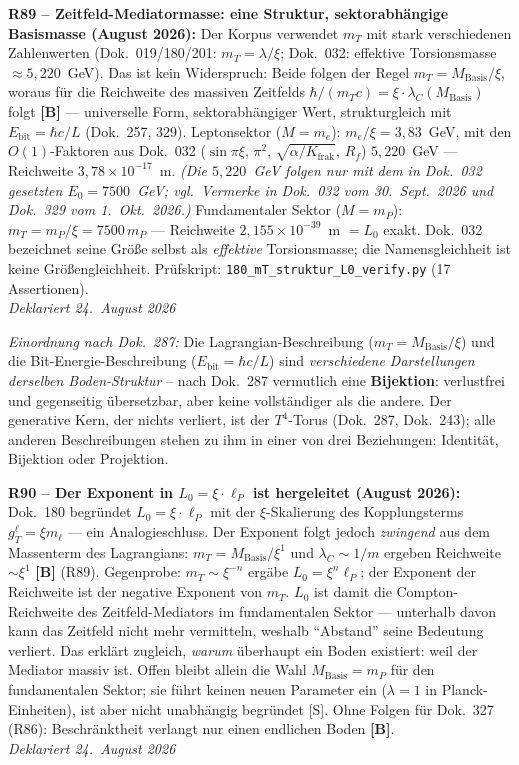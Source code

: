 \medskip

\textbf{R89 -- Zeitfeld-Mediatormasse: eine Struktur, sektorabh\"angige Basismasse (August 2026):}
Der Korpus verwendet $m_T$ mit stark verschiedenen Zahlenwerten (Dok.~019/180/201: $m_T = \lambda/\xi$; Dok.~032: effektive Torsionsmasse $\approx 5{,}220$~GeV). Das ist kein Widerspruch: Beide folgen der Regel $m_T = M_\mathrm{Basis}/\xi$, woraus f\"ur die Reichweite des massiven Zeitfelds $\hbar/(m_T c) = \xi\cdot\lambda_C(M_\mathrm{Basis})$ folgt \textbf{[B]} --- universelle Form, sektorabh\"angiger Wert, strukturgleich mit $E_\mathrm{bit} = \hbar c/L$ (Dok.~257, 329).
Leptonsektor ($M = m_e$): $m_e/\xi = 3{,}83$~GeV, mit den $O(1)$-Faktoren aus Dok.~032 ($\sin\pi\xi$, $\pi^2$, $\sqrt{\alpha/K_\mathrm{frak}}$, $R_f$) $5{,}220$~GeV --- Reichweite $3{,}78\times10^{-17}$~m. \emph{(Die $5{,}220$~GeV folgen nur mit dem in Dok.~032 gesetzten $E_0=7500$~GeV; vgl.\ Vermerke in Dok.~032 vom 30.~Sept.~2026 und Dok.~329 vom 1.~Okt.~2026.)}
Fundamentaler Sektor ($M = m_P$): $m_T = m_P/\xi = 7500\,m_P$ --- Reichweite $2{,}155\times10^{-39}$~m $= L_0$ exakt.
Dok.~032 bezeichnet seine Gr\"o\ss{}e selbst als \emph{effektive} Torsionsmasse; die Namensgleichheit ist keine Gr\"o\ss{}engleichheit.
Pr\"ufskript: \texttt{180\_mT\_struktur\_L0\_verify.py} (17 Assertionen).\\
\emph{Deklariert 24.~August 2026}

\medskip

\noindent\textit{Einordnung nach Dok.~287:} Die Lagrangian-Beschreibung
($m_T = M_\mathrm{Basis}/\xi$) und die Bit-Energie-Beschreibung
($E_\mathrm{bit} = \hbar c/L$) sind \emph{verschiedene Darstellungen derselben
Boden-Struktur} -- nach Dok.~287 vermutlich eine \textbf{Bijektion}: verlustfrei
und gegenseitig \"ubersetzbar, aber keine vollst\"andiger als die andere.
Der generative Kern, der nichts verliert, ist der $T^4$-Torus (Dok.~287, Dok.~243);
alle anderen Beschreibungen stehen zu ihm in einer von drei Beziehungen:
Identit\"at, Bijektion oder Projektion.

\medskip
\textbf{R90 -- Der Exponent in $L_0 = \xi\cdot\ell_P$ ist hergeleitet (August 2026):}
Dok.~180 begr\"undet $L_0 = \xi\cdot\ell_P$ mit der $\xi$-Skalierung des Kopplungsterms $g_T^\ell = \xi m_\ell$ --- ein Analogieschluss.
Der Exponent folgt jedoch \emph{zwingend} aus dem Massenterm des Lagrangians: $m_T = M_\mathrm{Basis}/\xi^1$ und $\lambda_C \sim 1/m$ ergeben Reichweite $\sim\xi^1$ \textbf{[B]} (R89).
Gegenprobe: $m_T \sim \xi^{-n}$ erg\"abe $L_0 = \xi^n\ell_P$; der Exponent der Reichweite ist der negative Exponent von $m_T$.
$L_0$ ist damit die Compton-Reichweite des Zeitfeld-Mediators im fundamentalen Sektor --- unterhalb davon kann das Zeitfeld nicht mehr vermitteln, weshalb \enquote{Abstand} seine Bedeutung verliert. Das erkl\"art zugleich, \emph{warum} \"uberhaupt ein Boden existiert: weil der Mediator massiv ist.
Offen bleibt allein die Wahl $M_\mathrm{Basis} = m_P$ f\"ur den fundamentalen Sektor; sie f\"uhrt keinen neuen Parameter ein ($\lambda = 1$ in Planck-Einheiten), ist aber nicht unabh\"angig begr\"undet [S].
Ohne Folgen f\"ur Dok.~327 (R86): Beschr\"anktheit verlangt nur einen endlichen Boden \textbf{[B]}.\\
\emph{Deklariert 24.~August 2026}

